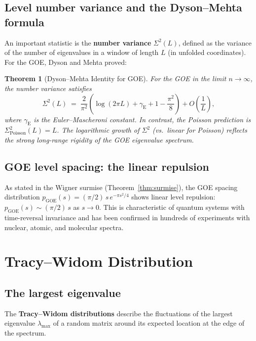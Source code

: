 \documentclass[12pt,a4paper]{amsart}
\newtheorem{theorem}{Theorem}[section]
\theoremstyle{definition}
\theoremstyle{remark}
\begin{document}
\subsection{Level number variance and the Dyson--Mehta formula}

An important statistic is the \textbf{number variance} $\Sigma^2(L)$, defined as
the variance of the number of eigenvalues in a window of length $L$ (in
unfolded coordinates). For the GOE, Dyson and Mehta \cite{Mehta2004} proved:

\begin{theorem}[Dyson--Mehta Identity for GOE]
\label{thm:dysonmehta}
For the GOE in the limit $n \to \infty$, the number variance satisfies
\[
  \Sigma^2(L) \;=\; \frac{2}{\pi^2}\left(\log(2\pi L) + \gamma_{\mathrm{E}} + 1 - \frac{\pi^2}{8}\right)
  + O\!\left(\frac{1}{L}\right),
\]
where $\gamma_{\mathrm{E}}$ is the Euler--Mascheroni constant. In contrast, the
Poisson prediction is $\Sigma^2_{\mathrm{Poisson}}(L) = L$.
The logarithmic growth of $\Sigma^2$ (vs.\ linear for Poisson) reflects
the strong \emph{long-range rigidity} of the GOE eigenvalue spectrum.
\end{theorem}

\subsection{GOE level spacing: the linear repulsion}

As stated in the Wigner surmise (Theorem~\ref{thm:surmise}),
the GOE spacing distribution $p_{\mathrm{GOE}}(s) = (\pi/2)\,s\,e^{-\pi s^2/4}$
shows linear level repulsion: $p_{\mathrm{GOE}}(s) \sim (\pi/2)\,s$ as $s \to 0$.
This is characteristic of quantum systems with time-reversal invariance and
has been confirmed in hundreds of experiments with nuclear, atomic, and
molecular spectra.

\section{Tracy--Widom Distribution}
\label{sec:tracywidom}

\subsection{The largest eigenvalue}

The \textbf{Tracy--Widom distributions} describe the fluctuations of the
largest eigenvalue $\lambda_{\max}$ of a random matrix around its expected
location at the edge of the spectrum.
\end{document}
